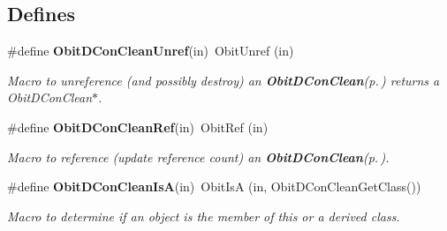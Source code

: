 \subsection*{Defines}
\begin{CompactItemize}
\item 
\#define {\bf Obit\-DCon\-Clean\-Unref}(in)\ Obit\-Unref (in)
\begin{CompactList}\small\item\em Macro to unreference (and possibly destroy) an {\bf Obit\-DCon\-Clean}{\rm (p.\,\pageref{structObitDConClean})} returns a Obit\-DCon\-Clean$\ast$. \item\end{CompactList}\item 
\#define {\bf Obit\-DCon\-Clean\-Ref}(in)\ Obit\-Ref (in)
\begin{CompactList}\small\item\em Macro to reference (update reference count) an {\bf Obit\-DCon\-Clean}{\rm (p.\,\pageref{structObitDConClean})}. \item\end{CompactList}\item 
\#define {\bf Obit\-DCon\-Clean\-Is\-A}(in)\ Obit\-Is\-A (in, Obit\-DCon\-Clean\-Get\-Class())
\begin{CompactList}\small\item\em Macro to determine if an object is the member of this or a derived class. \item\end{CompactList}\end{CompactItemize}
